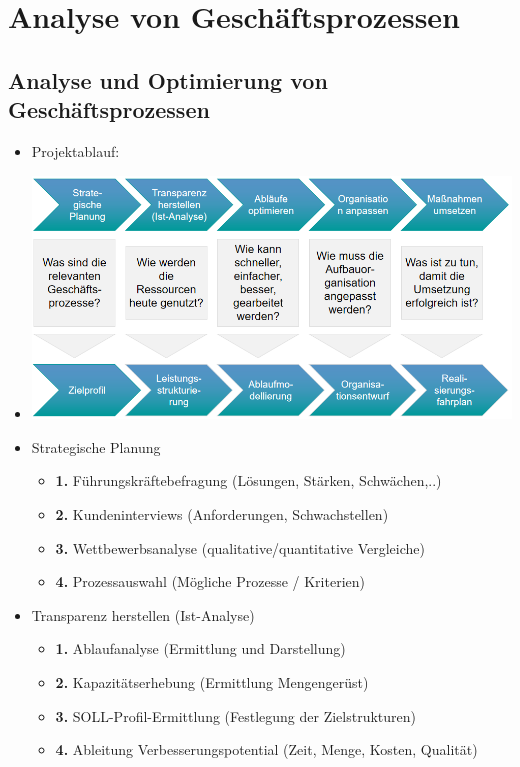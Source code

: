\documentclass[11pt,a4paper]{article}
\begin{document}
\section{Analyse von Geschäftsprozessen}
\subsection{Analyse und Optimierung von Geschäftsprozessen}
\begin{itemize}
\item Projektablauf:
\item[] \includegraphics[width=15cm]{projektablauf}


\item Strategische Planung
	\begin{itemize}
	\item \textbf{1.} Führungskräftebefragung (Lösungen, Stärken, Schwächen,..)
	\item \textbf{2.} Kundeninterviews (Anforderungen, Schwachstellen)
	\item \textbf{3.} Wettbewerbsanalyse (qualitative/quantitative Vergleiche)
	\item \textbf{4.} Prozessauswahl (Mögliche Prozesse / Kriterien)
	\end{itemize}
	
\item Transparenz herstellen (Ist-Analyse)
	\begin{itemize}
	\item \textbf{1.} Ablaufanalyse (Ermittlung und Darstellung)
	\item \textbf{2.} Kapazitätserhebung (Ermittlung Mengengerüst)
	\item \textbf{3.} SOLL-Profil-Ermittlung (Festlegung der Zielstrukturen) 
	\item \textbf{4.} Ableitung Verbesserungspotential (Zeit, Menge, Kosten, Qualität)
	\end{itemize}
	

\end{itemize}
\end{document}

